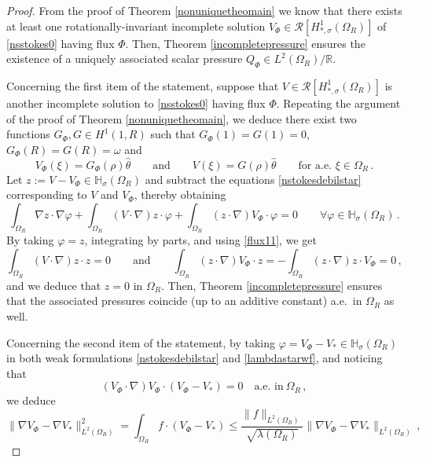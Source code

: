 \documentclass[a4paper,11pt]{article}
\numberwithin{equation}{section}
\numberwithin{figure}{section}
\begin{document}
\begin{proof} From the proof of Theorem
\ref{nonuniquetheomain} we know that there exists at least one rotationally-invariant incomplete solution $V_{\Phi} \in
\mathcal{R}[H^{1}_{*,\sigma}(\Omega_{R})]$ of \eqref{nsstokes0} having flux $\Phi$. Then, Theorem \ref{incompletepressure} ensures the existence
of a uniquely associated scalar pressure $Q_\Phi\in L^{2}(\Omega_{R})/\mathbb{R}$.\par
Concerning the first item of the statement, suppose that $V \in \mathcal{R}[H^{1}_{*,\sigma}(\Omega_{R})]$ is another incomplete solution to
\eqref{nsstokes0} having flux $\Phi$. Repeating the argument of the proof of Theorem \ref{nonuniquetheomain}, we deduce there exist two functions
$G_{\Phi}, G \in H^{1}(1,R)$ such that $G_{\Phi}(1)=G(1)=0$, $G_{\Phi}(R)=G(R)=\omega$ and
\begin{equation} \label{flux11}
V_{\Phi}(\xi) = G_{\Phi}(\rho) \widehat{\theta} \qquad \text{and} \qquad  V(\xi) = G(\rho) \widehat{\theta} \qquad \text{for a.e. }\xi \in
\Omega_{R} \, .
\end{equation}
Let $z := V - V_{\Phi} \in \mathbb{H}_{\sigma}(\Omega_{R})$ and subtract the equations \eqref{nstokesdebilstar} corresponding to $V$
and $V_{\Phi}$, thereby obtaining
$$
\int_{\Omega_{R}} \nabla z \cdot \nabla \varphi + \int_{\Omega_{R}} (V \cdot \nabla) z \cdot \varphi + \int_{\Omega_{R}} (z \cdot \nabla) V_{\Phi}
\cdot \varphi = 0 \qquad \forall \varphi \in \mathbb{H}_{\sigma}(\Omega_{R}) \, .
$$
By taking $\varphi=z$, integrating by parts, and using \eqref{flux11}, we get
$$
\int_{\Omega_{R}} (V \cdot \nabla) z \cdot z = 0 \qquad \text{and} \qquad \int_{\Omega_{R}} (z \cdot \nabla) V_{\Phi} \cdot z = -
\int_{\Omega_{R}} (z \cdot \nabla) z \cdot V_{\Phi} = 0 \, ,
$$
and we deduce that $z=0$ in $\Omega_{R}$. Then, Theorem \ref{incompletepressure} ensures that the associated pressures coincide (up to an additive constant)
a.e.\ in $\Omega_{R}$ as well.
\par
Concerning the second item of the statement, by taking $\varphi = V_{\Phi} - V_{*} \in \mathbb{H}_{\sigma}(\Omega_{R})$ in both weak formulations
\eqref{nstokesdebilstar} and \eqref{lambdastarwf}, and noticing that
$$
(V_{\Phi} \cdot \nabla) V_{\Phi} \cdot (V_{\Phi} - V_{*}) =0 \quad \text{a.e. in} \ \Omega_{R} \, ,
$$
we deduce
$$
\| \nabla V_{\Phi} - \nabla V_{*} \|^{2}_{L^{2}(\Omega_{R})} = \int_{\Omega_{R}} f \cdot (V_{\Phi} - V_{*}) \leq
\dfrac{\|f\|_{L^2(\Omega_{R})}}{\sqrt{\lambda(\Omega_{R})}} \| \nabla V_{\Phi} - \nabla V_{*} \|_{L^{2}(\Omega_{R})} \, ,
$$
\end{proof}
\end{document}
